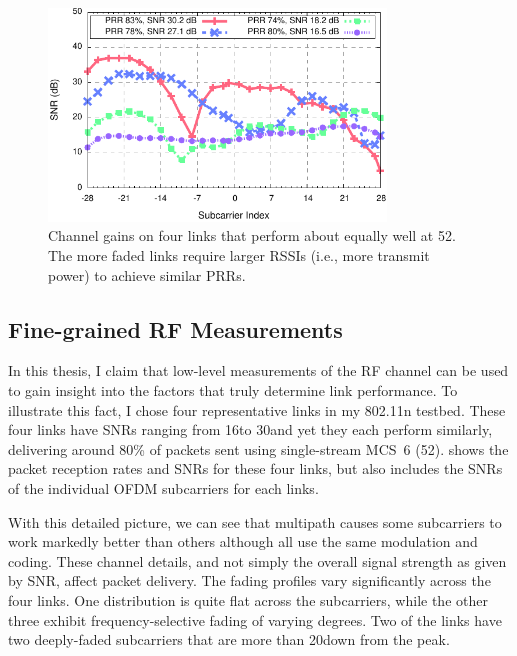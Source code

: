 \begin{figure}[t]
  \centering
  \includegraphics[width=0.8\textwidth]{figures/fsf_shape.pdf}
  \caption[Channel gains on four links that perform about equally well at 52\Mbps.]{Channel gains on four links that perform about equally well at 52\Mbps. The more faded links require larger RSSIs (i.e., more transmit power) to achieve similar PRRs.}
  \label{fig:example_fsf_shape}

\end{figure}

\subsection{Fine-grained RF Measurements}
In this thesis, I claim that low-level measurements of the RF channel can be used to gain insight into the factors that truly determine link performance. To illustrate this fact, I chose four representative links in my 802.11n testbed. These four links have SNRs ranging from 16\dB to 30\dB and yet they each perform similarly, delivering around 80\% of packets sent using single-stream MCS~6 (52\Mbps).  shows the packet reception rates and SNRs for these four links, but also includes the SNRs of the individual OFDM subcarriers for each links.

With this detailed picture, we can see that multipath causes some subcarriers to work markedly better than others although all use the same modulation and coding. These channel details, and not simply the overall signal strength as given by SNR, affect packet delivery. The fading profiles vary significantly across the four links. One distribution is quite flat across the subcarriers, while the other three exhibit frequency-selective fading of varying degrees. Two of the links have two deeply-faded subcarriers that are more than 20\dB down from the peak.

